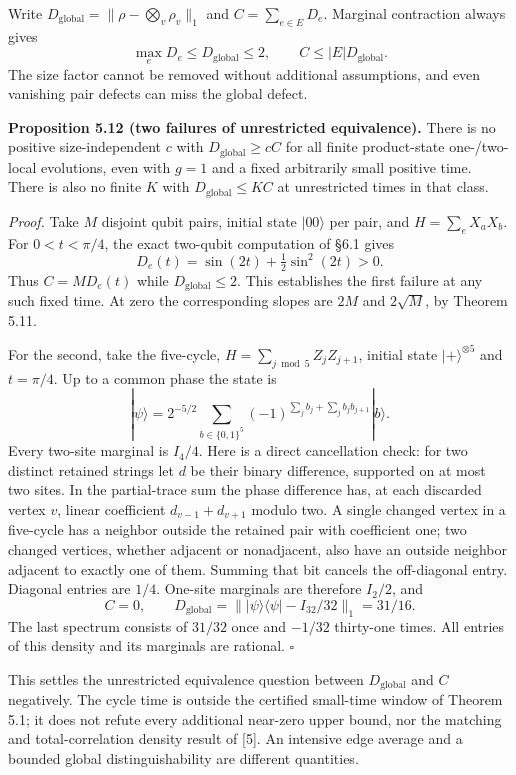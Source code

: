 \documentclass[
  11pt,
]{article}
\begin{document}
Write \(D_{\mathrm{global}}=\lVert \rho-\bigotimes_v\rho_v\rVert_1\) and
\(C=\sum_{e\in E}D_e\). Marginal contraction always gives
\[
\max_eD_e\le D_{\mathrm{global}}\le2,
\qquad C\le |E|D_{\mathrm{global}}.
\]
The size factor cannot be removed without additional assumptions, and even vanishing pair defects can
miss the global defect.

\textbf{Proposition 5.12 (two failures of unrestricted equivalence).} There is no
positive size-independent \(c\) with \(D_{\mathrm{global}}\ge cC\) for all finite
product-state one-/two-local evolutions, even with \(g=1\) and a fixed arbitrarily
small positive time. There is also no finite \(K\) with
\(D_{\mathrm{global}}\le KC\) at unrestricted times in that class.

\emph{Proof.} Take \(M\) disjoint qubit pairs, initial state \(|00\rangle\) per pair,
and \(H=\sum_eX_aX_b\). For \(0<t<\pi/4\), the exact two-qubit computation of
§6.1 gives
\[
D_e(t)=\sin(2t)+\tfrac12\sin^2(2t)>0.
\]
Thus \(C=MD_e(t)\) while \(D_{\mathrm{global}}\le2\). This establishes the first
failure at any such fixed time. At zero the corresponding slopes are \(2M\)
and \(2\sqrt M\), by Theorem 5.11.

For the second, take the five-cycle, \(H=\sum_{j\bmod5}Z_jZ_{j+1}\), initial
state \(|+\rangle^{\otimes5}\) and \(t=\pi/4\). Up to a common phase the state is
\[
|\psi\rangle=2^{-5/2}\sum_{b\in\{0,1\}^5}
       (-1)^{\sum_jb_j+\sum_jb_jb_{j+1}}|b\rangle.
\]
Every two-site marginal is \(I_4/4\). Here is a direct cancellation check:
for two distinct retained strings let \(d\) be their binary difference,
supported on at most two sites. In the partial-trace sum the phase difference
has, at each discarded vertex \(v\), linear coefficient
\(d_{v-1}+d_{v+1}\) modulo two. A single changed vertex in a five-cycle has a
neighbor outside the retained pair with coefficient one; two changed vertices,
whether adjacent or nonadjacent, also have an outside neighbor adjacent to
exactly one of them. Summing that bit cancels the off-diagonal entry. Diagonal
entries are \(1/4\). One-site marginals are therefore \(I_2/2\), and
\[
C=0,\qquad D_{\mathrm{global}}
 =\bigl\lVert |\psi\rangle\langle\psi|-I_{32}/32\bigr\rVert_1=31/16.
\]
The last spectrum consists of \(31/32\) once and \(-1/32\) thirty-one times.
All entries of this density and its marginals are rational. \(\square\)

This settles the unrestricted equivalence question between \(D_{\mathrm{global}}\) and \(C\) negatively.
The cycle time is outside the certified small-time window of Theorem 5.1;
it does not refute every additional near-zero upper bound, nor the matching
and total-correlation density result of {[}5{]}. An intensive edge
average and a bounded global distinguishability are different quantities.
\end{document}
